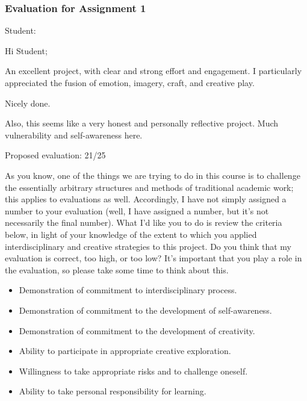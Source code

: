 \documentclass[letterpaper,10pt,DIV=9,headsepline]{scrreprt}
\begin{document}
\newpage

\subsubsection{Evaluation for Assignment 1}

Student: 

\bigskip
Hi Student;

An excellent project, with clear and strong effort and engagement. I
particularly appreciated the fusion of emotion, imagery, craft, and
creative play.

Nicely done.

Also, this seems like a very honest and personally reflective project.
Much vulnerability and self-awareness here.



\bigskip
Proposed evaluation: 21/25

\bigskip
As you know, one of the things we are trying to do in this course is
to challenge the essentially arbitrary structures and methods of
traditional academic work; this applies to evaluations as well.
Accordingly, I have not simply assigned a number to your evaluation
(well, I have assigned a number, but it's not necessarily the final
number). What I'd like you to do is review the criteria below, in
light of your knowledge of the extent to which you applied
interdisciplinary and creative strategies to this project. Do you
think that my evaluation is correct, too high, or too low? It's
important that you play a role in the evaluation, so please take some
time to think about this.

\begin{itemize}
\item Demonstration of commitment to interdisciplinary process.
\item Demonstration of commitment to the development of self-awareness.
\item Demonstration of commitment to the development of creativity.
\item Ability to participate in appropriate creative exploration.
\item Willingness to take appropriate risks and to challenge oneself.
\item Ability to take personal responsibility for learning.
\end{itemize}
\end{document}
